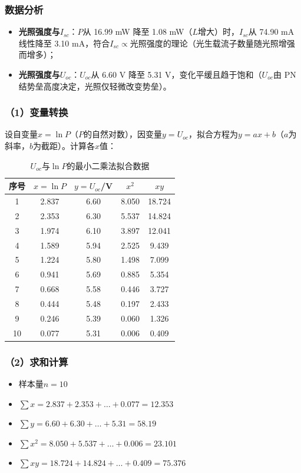 \documentclass[12pt]{article}
\begin{document}
\subsubsection{数据分析}
\begin{itemize}
  \item \textbf{光照强度与$I_{sc}$}：$P$从 16.99 mW 降至 1.08 mW（$L$增大）时，$I_{sc}$从 74.90 mA 线性降至 3.10 mA，符合$I_{sc} \propto$光照强度的理论（光生载流子数量随光照增强而增多）；
  \item \textbf{光照强度与$U_{oc}$}：$U_{oc}$从 6.60 V 降至 5.31 V，变化平缓且趋于饱和（$U_{oc}$由 PN 结势垒高度决定，光照仅轻微改变势垒）。
\end{itemize}

\subsubsection{（1）变量转换}
设自变量$x = \ln P$（$P$的自然对数），因变量$y = U_{oc}$，拟合方程为$y = ax + b$（$a$为斜率，$b$为截距）。计算各$x$值：

\begin{table}[h]
\centering
\caption{$U_{oc}$与$\ln P$的最小二乘法拟合数据}
\begin{tabular}{|c|c|c|c|c|}
\hline
序号 & $x = \ln P$ & $y = U_{oc}$/V & $x^2$ & $xy$ \\
\hline
1 & 2.837 & 6.60 & 8.050 & 18.724 \\
2 & 2.353 & 6.30 & 5.537 & 14.824 \\
3 & 1.974 & 6.10 & 3.897 & 12.041 \\
4 & 1.589 & 5.94 & 2.525 & 9.439 \\
5 & 1.224 & 5.80 & 1.498 & 7.099 \\
6 & 0.941 & 5.69 & 0.885 & 5.354 \\
7 & 0.668 & 5.58 & 0.446 & 3.727 \\
8 & 0.444 & 5.48 & 0.197 & 2.433 \\
9 & 0.246 & 5.39 & 0.060 & 1.326 \\
10 & 0.077 & 5.31 & 0.006 & 0.409 \\
\hline
\end{tabular}
\end{table}

\subsubsection{（2）求和计算}
\begin{itemize}
  \item 样本量$n = 10$
  \item $\sum x = 2.837+2.353+\dots+ 0.077 = 12.353$
  \item $\sum y = 6.60 + 6.30 + \dots + 5.31 = 58.19$
  \item $\sum x^2 = 8.050 + 5.537 + \dots + 0.006 = 23.101$
  \item $\sum xy = 18.724 + 14.824 + \dots + 0.409 = 75.376$
\end{itemize}
\end{document}
